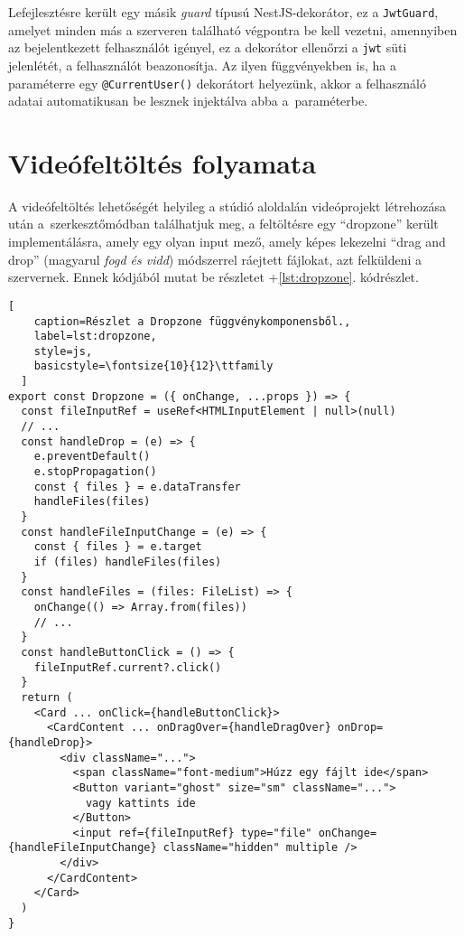 Lefejlesztésre került egy másik \emph{guard} típusú NestJS-dekorátor, ez a \verb|JwtGuard|, amelyet minden más a szerveren található végpontra be kell vezetni, amennyiben az bejelentkezett felhasználót igényel, ez a dekorátor ellenőrzi a \verb|jwt| süti jelenlétét, a felhasználót beazonosítja. Az ilyen függvényekben is, ha a paraméterre egy \verb|@CurrentUser()| dekorátort helyezünk, akkor a felhasználó adatai automatikusan be lesznek injektálva abba a~paraméterbe.

\section{Videófeltöltés folyamata}

A videófeltöltés lehetőségét helyileg a stúdió aloldalán videóprojekt létrehozása után a~szerkesztőmódban találhatjuk meg, a feltöltésre egy ``dropzone'' került implementálásra, amely egy olyan input mező, amely képes lekezelni ``drag and drop'' (magyarul \emph{fogd és vidd}) módszerrel ráejtett fájlokat, azt felküldeni a szervernek. Ennek kódjából mutat be részletet \az+\ref{lst:dropzone}. kódrészlet.

\begin{minipage}{0.92\textwidth}
  \begin{lstlisting}[
    caption=Részlet a Dropzone függvénykomponensből.,
    label=lst:dropzone,
    style=js,
    basicstyle=\fontsize{10}{12}\ttfamily
  ]
export const Dropzone = ({ onChange, ...props }) => {
  const fileInputRef = useRef<HTMLInputElement | null>(null)
  // ...
  const handleDrop = (e) => {
    e.preventDefault()
    e.stopPropagation()
    const { files } = e.dataTransfer
    handleFiles(files)
  }
  const handleFileInputChange = (e) => {
    const { files } = e.target
    if (files) handleFiles(files)
  }
  const handleFiles = (files: FileList) => {
    onChange(() => Array.from(files))
    // ...
  }
  const handleButtonClick = () => {
    fileInputRef.current?.click()
  }
  return (
    <Card ... onClick={handleButtonClick}>
      <CardContent ... onDragOver={handleDragOver} onDrop={handleDrop}>
        <div className="...">
          <span className="font-medium">Húzz egy fájlt ide</span>
          <Button variant="ghost" size="sm" className="...">
            vagy kattints ide
          </Button>
          <input ref={fileInputRef} type="file" onChange={handleFileInputChange} className="hidden" multiple />
        </div>
      </CardContent>
    </Card>
  )
}
\end{lstlisting}
\end{minipage}

